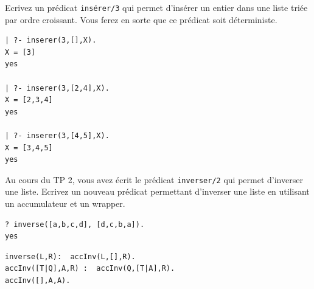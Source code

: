 \documentclass[a4paper]{article}
\newenvironment{CAnswer}{\color{red}\begin{Answer}}
                        {\end{Answer}}
\begin{document}
\begin{Exercise}[title={insérer un élément dans une liste}]
Ecrivez un prédicat \verb#insérer/3# qui permet d'insérer un entier dans une 
liste triée par ordre croissant. Vous ferez en sorte que ce prédicat soit 
déterministe.
\begin{verbatim}
| ?- inserer(3,[],X).   
X = [3] 
yes 

| ?- inserer(3,[2,4],X). 
X = [2,3,4] 
yes 

| ?- inserer(3,[4,5],X). 
X = [3,4,5] 
yes 
\end{verbatim}
\end{Exercise}
\begin{CAnswer}

\end{CAnswer}


\begin{Exercise}[title={inversion d'une liste}]
Au cours du TP 2, vous avez écrit le prédicat \verb#inverser/2# qui permet
d'inverser une liste. Ecrivez un nouveau prédicat permettant d'inverser une
liste en utilisant un accumulateur et un wrapper.
\begin{verbatim}
?­ inverse([a,b,c,d], [d,c,b,a]). 
yes 
\end{verbatim}
\end{Exercise}
\begin{CAnswer}
\begin{verbatim}
inverse(L,R):­  accInv(L,[],R). 
accInv([T|Q],A,R) :­  accInv(Q,[T|A],R). 
accInv([],A,A). 
\end{verbatim} 
\end{CAnswer}
\end{document}
